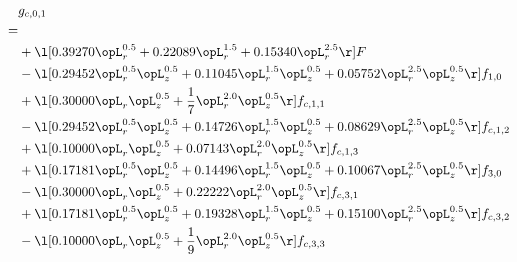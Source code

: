 \begin{alignat}{2} 
\label{eq:g_01_0} 
& g_{c,0,1} \nonumber \\ 
 = \\ 
& + \l[  0.39270 \opL_r^{0.5} +  0.22089 \opL_r^{1.5} +  0.15340 \opL_r^{2.5}  \r] F \nonumber \\ 
& - \l[  0.29452 \opL_r^{0.5} \opL_z^{0.5} +  0.11045 \opL_r^{1.5} \opL_z^{0.5} +  0.05752 \opL_r^{2.5} \opL_z^{0.5}  \r] f_{1,0} \nonumber \\ 
& + \l[  0.30000 \opL_r \opL_z^{0.5} + \frac{1}{7} \opL_r^{2.0} \opL_z^{0.5}  \r] f_{c,1,1} \nonumber \\ 
& - \l[  0.29452 \opL_r^{0.5} \opL_z^{0.5} +  0.14726 \opL_r^{1.5} \opL_z^{0.5} +  0.08629 \opL_r^{2.5} \opL_z^{0.5}  \r] f_{c,1,2} \nonumber \\ 
& + \l[  0.10000 \opL_r \opL_z^{0.5} +  0.07143 \opL_r^{2.0} \opL_z^{0.5}  \r] f_{c,1,3} \nonumber \\ 
& + \l[  0.17181 \opL_r^{0.5} \opL_z^{0.5} +  0.14496 \opL_r^{1.5} \opL_z^{0.5} +  0.10067 \opL_r^{2.5} \opL_z^{0.5}  \r] f_{3,0} \nonumber \\ 
& - \l[  0.30000 \opL_r \opL_z^{0.5} +  0.22222 \opL_r^{2.0} \opL_z^{0.5}  \r] f_{c,3,1} \nonumber \\ 
& + \l[  0.17181 \opL_r^{0.5} \opL_z^{0.5} +  0.19328 \opL_r^{1.5} \opL_z^{0.5} +  0.15100 \opL_r^{2.5} \opL_z^{0.5}  \r] f_{c,3,2} \nonumber \\ 
& - \l[  0.10000 \opL_r \opL_z^{0.5} + \frac{1}{9} \opL_r^{2.0} \opL_z^{0.5}  \r] f_{c,3,3} \nonumber \\ 
\end{alignat} 


